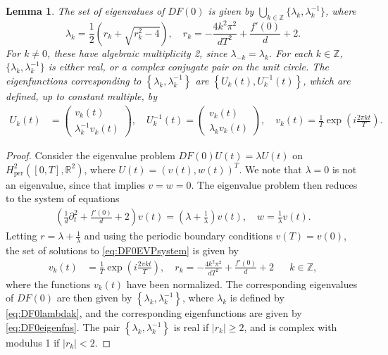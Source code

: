 \documentclass[12pt,reqno]{amsart}
\def\R{{\mathbb R}}
\def\Z{{\mathbb Z}}
\def\per{\textrm{per}}
\newtheorem{lemma}{Lemma}
\begin{document}
\begin{lemma}\label{lemma:DF0eigs}
The set of eigenvalues of $DF(0)$ is given by $\bigcup_{k \in \Z} \{\lambda_k, \lambda_k^{-1} \}$, where 
\begin{equation}\label{eq:DF0lambdak}
\lambda_k = \frac{1}{2}\left( r_k + \sqrt{r_k^2 - 4} \right), \quad r_k = -\frac{4 k^2 \pi^2}{d T^2} + \frac{f'(0)}{d} + 2.
\end{equation}
For $k \neq 0$, these have algebraic multiplicity 2, since $\lambda_{-k} = \lambda_k$. For each $k \in \Z$, $\{\lambda_k, \lambda_k^{-1} \}$ is either real, or a complex conjugate pair on the unit circle. The eigenfunctions corresponding to $\left\{ \lambda_k, \lambda_k^{-1} \right\}$ are $\left\{ U_k(t), U_k^{-1}(t) \right\}$, which are defined, up to constant multiple, by 
\begin{equation}\label{eq:DF0eigenfns}
\begin{aligned}
U_k(t) &= \begin{pmatrix}v_k(t) \\ \lambda_k^{-1}  v_k(t) \end{pmatrix}, \quad
U_k^{-1}(t) = \begin{pmatrix}v_k(t) \\ \lambda_k v_k(t) \end{pmatrix}, \quad
v_k(t) = \frac{1}{T} \exp\left( i \frac{2 \pi k t}{T} \right).
\end{aligned}
\end{equation}
\end{lemma}
\begin{proof}
Consider the eigenvalue problem $DF(0) U(t) = \lambda U(t)$ on $H^2_\per([0,T],\R^2)$, where $U(t) = (v(t), w(t))^T$. We note that $\lambda = 0$ is not an eigenvalue, since that implies $v = w = 0$. The eigenvalue problem then reduces to the system of equations
\begin{align}\label{eq:DF0EVPsystem}
\left( \frac{1}{d}\partial_t^2 + \frac{f'(0)}{d} + 2 \right) v(t) = \left( \lambda + \frac{1}{\lambda} \right) v(t), \quad
w = \frac{1}{\lambda} v(t).
\end{align}
Letting $r = \lambda + \frac{1}{\lambda}$ and using the periodic boundary conditions $v(T) = v(0)$, the set of solutions to \cref{eq:DF0EVPsystem} is given by
\begin{align}
v_k(t) &= \frac{1}{T} \exp\left( i \frac{2 \pi k t}{T} \right), \quad r_k = -\frac{4 k^2 \pi^2}{d T^2} + \frac{f'(0)}{d} + 2 && k \in \Z,
\end{align}
where the functions $v_k(t)$ have been normalized. The corresponding eigenvalues of $DF(0)$ are then given by $\left\{ \lambda_k, \lambda_k^{-1} \right\}$, where $\lambda_k$ is defined by \cref{eq:DF0lambdak}, and the corresponding eigenfunctions are given by \cref{eq:DF0eigenfns}. The pair $\left\{ \lambda_k, \lambda_k^{-1} \right\}$ is real if $|r_k| \geq 2$, and is complex with modulus 1 if $|r_k| < 2$.
\end{proof}
\end{document}
